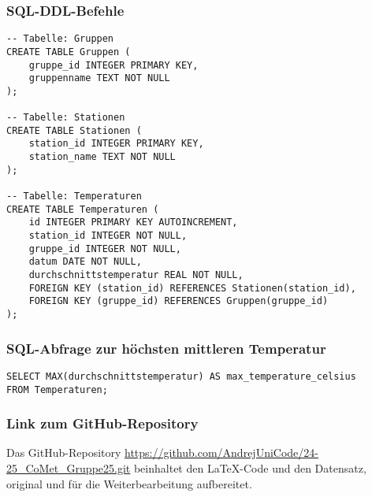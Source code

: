 \documentclass{article}
\begin{document}
\subsubsection{SQL-DDL-Befehle}
\begin{verbatim}
-- Tabelle: Gruppen
CREATE TABLE Gruppen (
    gruppe_id INTEGER PRIMARY KEY,
    gruppenname TEXT NOT NULL
);

-- Tabelle: Stationen
CREATE TABLE Stationen (
    station_id INTEGER PRIMARY KEY,
    station_name TEXT NOT NULL
);

-- Tabelle: Temperaturen
CREATE TABLE Temperaturen (
    id INTEGER PRIMARY KEY AUTOINCREMENT,
    station_id INTEGER NOT NULL,
    gruppe_id INTEGER NOT NULL,
    datum DATE NOT NULL,
    durchschnittstemperatur REAL NOT NULL,
    FOREIGN KEY (station_id) REFERENCES Stationen(station_id),
    FOREIGN KEY (gruppe_id) REFERENCES Gruppen(gruppe_id)
);
\end{verbatim}

\subsubsection{SQL-Abfrage zur höchsten mittleren Temperatur}

\begin{verbatim}
SELECT MAX(durchschnittstemperatur) AS max_temperature_celsius
FROM Temperaturen;
\end{verbatim}

\subsubsection{Link zum GitHub-Repository}
Das GitHub-Repository \url{https://github.com/AndrejUniCode/24-25_CoMet_Gruppe25.git} beinhaltet den LaTeX-Code und den Datensatz, original und für die Weiterbearbeitung aufbereitet.

\newpage
\renewcommand{\refname}{Literatur}


\end{document}
